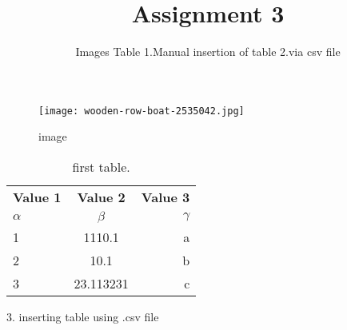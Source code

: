 \documentclass{article}
\title{Assignment 3}
\author{Images Table 1.Manual insertion of table  2.via csv file}
\begin{document}
\maketitle
\begin{figure}
\texttt{[image: wooden-row-boat-2535042.jpg]}
\caption{image}
\label{fig:boat}
\end{figure}

\begin{table}[h!]
  \begin{center}
    \caption{ first table.}
    \vspace{1cm}
    \label{tab:table1}
    \begin{tabular}{|l|c|r|} 
      \hline
      \textbf{Value 1} & \textbf{Value 2} & \textbf{Value 3}\\
      $\alpha$ & $\beta$ & $\gamma$ \\
      \hline
     1 & 1110.1 & a\\
      2 & 10.1 & b\\
      3 & 23.113231 & c\\
      \hline
    \end{tabular}
  \end{center}
\end{table}
  
  
    3. inserting table using .csv file 
\begin{table}
\centering
{}
\end{table}
\end{document}
